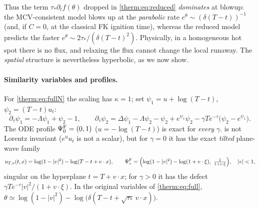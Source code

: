 Thus the term $\tau_*\partial_tf(\theta)$ dropped in \cref{therm:eq:reduced}
\emph{dominates} at blowup: the MCV-consistent model blows up at the
\emph{parabolic} rate $e^\theta\sim(\delta(T-t))^{-1}$ (and, if $C=0$, at the classical
FK ignition time), whereas the reduced model predicts the faster
$e^\theta\sim2\tau_*/(\delta(T-t)^2)$.  Physically, in a homogeneous hot spot there is no
flux, and relaxing the flux cannot change the local runaway.  The \emph{spatial}
structure is nevertheless hyperbolic, as we now show.

\paragraph{Similarity variables and profiles.}  For \cref{therm:eq:fullN} the
scaling has $\kappa=1$; set $\psi_1=u+\log(T-t)$, $\psi_2=(T-t)u_t$:
\begin{equation}\label{therm:eq:simfull}
  \partial_\tau\psi_1=-\Lambda\psi_1+\psi_2-1,\qquad
  \partial_\tau\psi_2=\Delta\psi_1-\Lambda\psi_2-\psi_2+e^{\psi_1}\psi_2-\gamma Te^{-\tau}\bigl(\psi_2-e^{\psi_1}\bigr).
\end{equation}
The ODE profile $\Psi^{\rm F}_0=(0,1)$ ($u=-\log(T-t)$) is exact for \emph{every} $\gamma$.
 is not Lorentz invariant ($e^uu_t$ is not a
scalar), but for $\gamma=0$ it has the exact \emph{tilted} plane-wave family
\begin{equation}\label{therm:eq:tilted}
  u_{T,v}(t,x)=\log(1-|v|^2)-\log(T-t+v\cdot x),\qquad
  \Psi^{\rm F}_v=\Bigl(\log(1-|v|^2)-\log(1+v\cdot\xi),\ \tfrac{1}{1+v\cdot\xi}\Bigr),\quad |v|<1,
\end{equation}
singular on the hyperplane $t=T+v\cdot x$; for $\gamma>0$ it has the defect
$\gamma Te^{-\tau}|v|^2/(1+v\cdot\xi)$.  In the original variables of
\cref{therm:eq:full}, $\theta\simeq\log(1-|v|^2)-\log\bigl(\delta(T-t+\sqrt{\tau_*}\,v\cdot x)\bigr)$.

